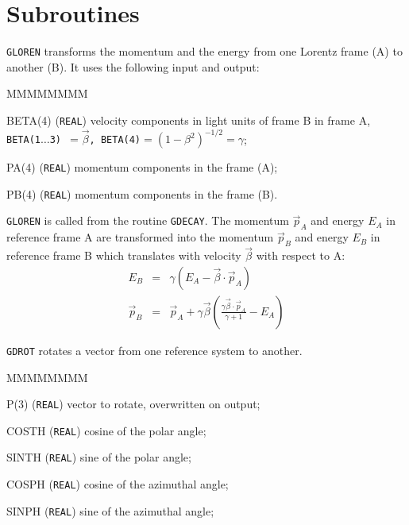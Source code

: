     
\section{Subroutines}
{\tt GLOREN} transforms the momentum and the energy from one 
Lorentz frame (A) to another (B). It uses the following input and output:
 
\begin{DLtt}{MMMMMMMM}
\item[BETA(4)] ({\tt REAL}) velocity components in light units
of frame B in frame A,
{\tt BETA(1$\ldots$3) $ = \vec{\beta}$, BETA(4)$=(1-\beta^2)^{-1/2} = 
\gamma$};
\item[PA(4)] ({\tt REAL}) momentum components in the frame (A);
\item[PB(4)] ({\tt REAL}) momentum components in the frame (B).
\end{DLtt}

{\tt GLOREN} is called from the routine {\tt GDECAY}.
The momentum $\vec{p}_A$ and energy $E_A$  in reference frame A are
transformed into the momentum $\vec{p}_B$ and energy $E_B$ in reference
frame B which translates with velocity $\vec{\beta}$ with respect
to A:
\begin{eqnarray*}
E_B        & = &\gamma (E_A - \vec{\beta}\cdot \vec{p}_A)\\
\vec{p}_B & = & \vec{p}_A +
\gamma \vec{\beta} \left(\frac{ \gamma \vec{\beta} \cdot \vec{p}_A}
{\gamma+1} - E_A \right)
\end{eqnarray*}

{\tt GDROT} rotates a vector from one reference system to another.

\begin{DLtt}{MMMMMMMM}
\item[P(3)] ({\tt REAL}) vector to rotate, overwritten on output;
\item[COSTH] ({\tt REAL}) cosine of the polar angle;
\item[SINTH] ({\tt REAL}) sine of the polar angle;
\item[COSPH] ({\tt REAL}) cosine of the azimuthal angle;
\item[SINPH] ({\tt REAL}) sine of the azimuthal angle;
\end{DLtt}

